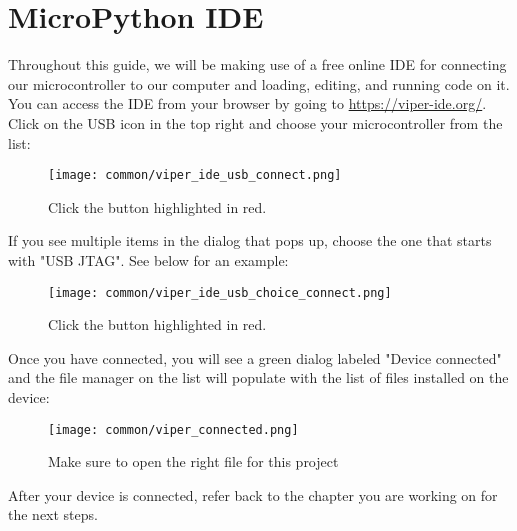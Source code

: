 \chapter{MicroPython IDE}

Throughout this guide, we will be making use of a free online IDE for connecting our microcontroller
to our computer and loading, editing, and running code on it. You can access the IDE from your browser
by going to \url{https://viper-ide.org/}. Click on the USB icon in the top right and choose your
microcontroller from the list:

\begin{figure}[H]
    \centering
    \texttt{[image: common/viper\_ide\_usb\_connect.png]}
    \caption{Click the button highlighted in red.}
\end{figure}

If you see multiple items in the dialog that pops up, choose the one that starts with "USB JTAG". See below for an example:
\begin{figure}[H]
    \centering
    \texttt{[image: common/viper\_ide\_usb\_choice\_connect.png]}
    \caption{Click the button highlighted in red.}
\end{figure}

Once you have connected, you will see a green dialog labeled "Device connected" and the file manager on the list
will populate with the list of files installed on the device:
\begin{figure}[H]
    \centering
    \texttt{[image: common/viper\_connected.png]}
    \caption{Make sure to open the right file for this project}
\end{figure}

After your device is connected, refer back to the chapter you are working on for the next steps.